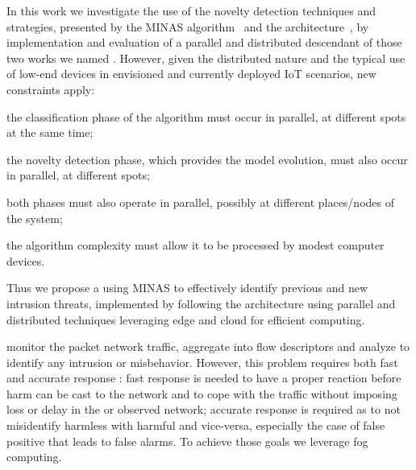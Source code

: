 In this work we investigate the use of the novelty detection techniques and strategies,
presented by the MINAS algorithm~\cite{MINAS} and the \arch architecture~\cite{Cassales2019a},
by implementation and evaluation of a parallel and distributed descendant of those two works
we named \mfog.
However, given the distributed nature and the typical use of 
low-end devices in envisioned and currently deployed IoT scenarios,  
new constraints apply:
\begin{enumerate*}[label=(\emph{\roman*})]
    \item the classification phase of the algorithm must occur in parallel,
    at different spots at the same time;
    \item the novelty detection phase, which provides the model evolution,
    must also occur in parallel, at different spots;
    \item both phases must also operate in parallel,
    possibly at different places/nodes of the system;
    \item the algorithm complexity must allow it to be processed by modest computer devices.
\end{enumerate*}



Thus we propose a \nids using MINAS \cite{Faria2016minas}
to effectively identify previous and new intrusion threats,
implemented by following the  architecture \cite{Cassales2019a} using parallel and distributed techniques leveraging
edge and cloud for efficient computing.

\nids 
monitor the packet network traffic, aggregate into flow descriptors and
analyze to identify any intrusion or misbehavior.
However, this problem requires both fast and accurate response \cite{DaCosta2019a}:
fast response is needed to have a proper reaction before harm can be cast
to the network and to cope with the traffic without imposing loss or delay
in the \nids or observed network;
accurate response is required as to not misidentify harmless with harmful and vice-versa,
especially the case of false positive that leads to false alarms.
To achieve those goals we leverage fog computing.

